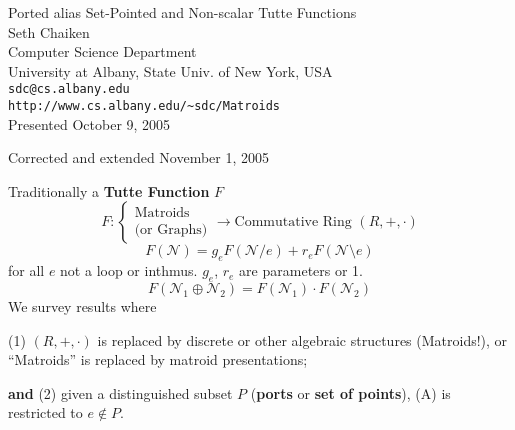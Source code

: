 \documentclass[%
  slidesonly,%
  semlayer,%
  amsmath
  ]{seminar}                                  %
\title{}
\author{}
\date{\today}
\begin{document}


\begin{slide}
\begin{center}
Ported alias Set-Pointed and Non-scalar Tutte Functions \\

Seth Chaiken\\
Computer Science Department\\[-0.8ex]
University at Albany, State Univ. of New York, USA\\[-0.8ex]
\texttt{sdc@cs.albany.edu}\\
\verb|http://www.cs.albany.edu/~sdc/Matroids|\\

Presented October 9, 2005

Corrected and extended November 1, 2005

\end{center}
\end{slide}

\begin{slide}
Traditionally a \textbf{Tutte Function} $F$
\[
F:\left\{\begin{array}{l} \mbox{Matroids } \\ \mbox{(or Graphs)} \end{array}\right.
\rightarrow \mbox{Commutative Ring\ \ } (R,+,\cdot)
\]
\begin{equation}
F(\mathcal{N}) = g_eF(\mathcal{N}/e) + r_eF(\mathcal{N}\setminus e)
\tag{A}
\end{equation}
for all $e$ not a loop or inthmus.  $g_e$, $r_e$ are parameters or 1.
\begin{equation}
F(\mathcal{N}_1\oplus\mathcal{N}_2)
=F(\mathcal{N}_1)\cdot F(\mathcal{N}_2)
\tag{M}
\end{equation}
We survey results where

\noindent (1) $(R,+,\cdot)$ is replaced by discrete or
other algebraic structures (Matroids!), or ``Matroids'' is replaced by 
matroid presentations;

\noindent \textbf{and} (2) given a distinguished subset $P$ (\textbf{ports} or
\textbf{set of points}), (A) is restricted to $e\not\in P$.
\end{slide}
\end{document}
